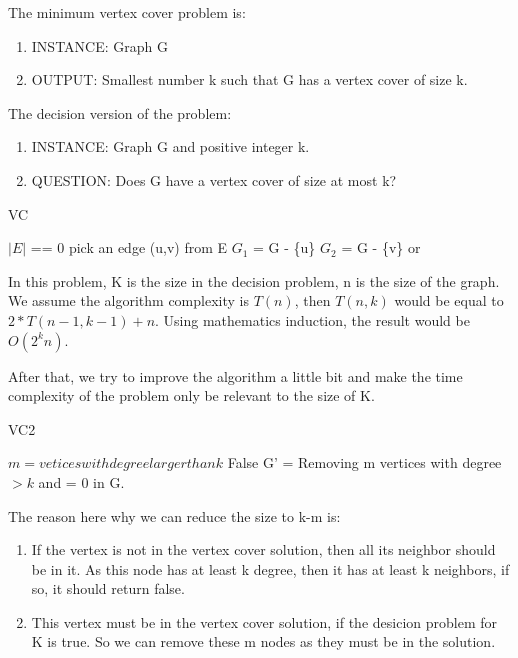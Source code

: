 \documentclass[usletter]{article}
\begin{document}
The minimum vertex cover problem is: 
\begin{enumerate}
	\item INSTANCE: Graph G
	\item OUTPUT: Smallest number k such that G has a vertex cover of size k.
\end{enumerate}


The decision version of the problem:
\begin{enumerate}
	\item INSTANCE: Graph G and positive integer k.
	\item QUESTION: Does G have a vertex cover of size at most k?
\end{enumerate}

\begin{algorithm}
\caption{VC}
\begin{algorithmic}[1]
	\State \Return $|E|$ == 0
\EndIf
\State pick an edge (u,v) from E
\State $G_{1}$ = G - \{u\}
\State $G_{2}$ = G - \{v\}
\State \Return {} or 
\EndProcedure
\end{algorithmic}
\end{algorithm}

In this problem, K is the size in the decision problem, n is the size of the graph. We assume the algorithm complexity is $T(n)$, then $T(n, k)$ would be equal to  $2*T(n-1, k-1)+n$. Using mathematics induction, the result would be $O(2^{k}n)$.

After that, we try to improve the algorithm a little bit and make the time complexity of the problem only be relevant to the size of K.

\begin{algorithm}
\caption{VC2}
\begin{algorithmic}[1]
\State $m=vetices with degree larger than k$
	\State \Return False
\EndIf
\State G' = Removing m vertices with degree $> k$ and = 0 in G. 
\State \Return {} 
\EndProcedure
\end{algorithmic}
\end{algorithm}
The reason here why we can reduce the size to k-m is: 
\begin{enumerate}
	\item If the vertex is not in the vertex cover solution, then all its neighbor should be in it. As this node has at least k degree, then it has at least k neighbors, if so, it should return false.
	\item This vertex must be in the vertex cover solution, if the desicion problem for K is true. So we can remove these m nodes as they must be in the solution.
\end{enumerate}
\end{document}
